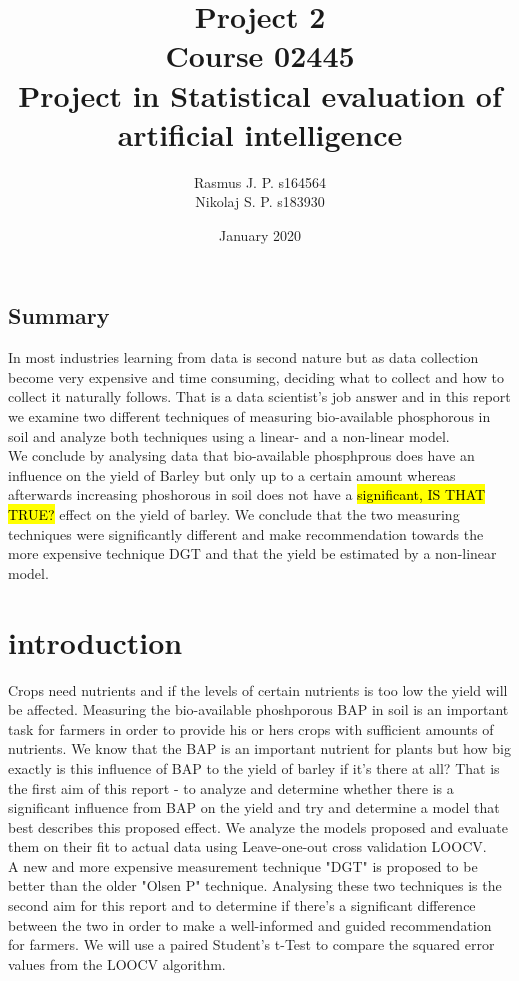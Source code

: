 \documentclass{article}
\begin{document}
\begin{titlepage}
	
	
	\title{Project 2 \\ Course 02445 \\ Project in Statistical evaluation of \\ artificial intelligence }
	\author{Rasmus J. P. s164564 \\ Nikolaj S. P. s183930}
	\date{January 2020}
	\maketitle
	
\subsection*{Summary}
In most industries learning from data is second nature but as data collection become very expensive and time consuming, deciding what to collect and how to collect it naturally follows. That is a data scientist's job answer and in this report we examine two different techniques of measuring bio-available phosphorous in soil and analyze both techniques using a linear- and a non-linear model.\\ We conclude by analysing data that bio-available phosphprous does have an influence on the yield of Barley but only up to a certain amount whereas afterwards increasing phoshorous in soil does not have a \hl{significant, IS THAT TRUE?} effect on the yield of barley. We conclude that the two measuring techniques were significantly different and make recommendation towards the more expensive technique DGT and that the yield be estimated by a non-linear model.
	
\end{titlepage}


\section{introduction}
Crops need nutrients and if the levels of certain nutrients is too low the yield will be affected. Measuring the bio-available phoshporous BAP in soil is an important task for farmers in order to provide his or hers crops with sufficient amounts of nutrients. We know that the BAP is an important nutrient for plants but how big exactly is this influence of BAP to the yield of barley if it's there at all? That is the first aim of this report - to analyze and determine whether there is a significant influence from BAP on the yield and try and determine a model that best describes this proposed effect. We analyze the models proposed and evaluate them on their fit to actual data using Leave-one-out cross validation LOOCV. \\ A new and more expensive measurement technique "DGT" is proposed to be better than the older "Olsen P" technique. Analysing these two techniques is the second aim for this report and to determine if there's a significant difference between the two in order to make a well-informed and guided recommendation for farmers. We will use a paired Student's t-Test to compare the squared error values from the LOOCV algorithm.
\end{document}
